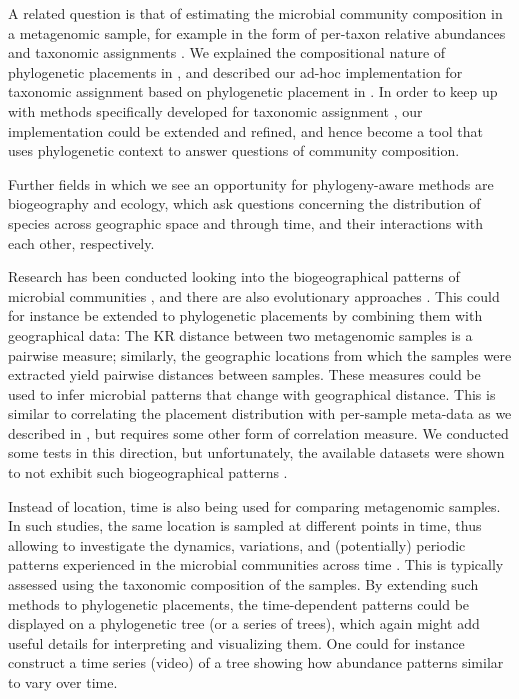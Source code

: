 A related question is that of estimating the microbial community composition in a metagenomic sample,
for example in the form of per-taxon relative abundances and taxonomic assignments \cite{Lindgreen2016}.
We explained the compositional nature of phylogenetic placements in
,
and described our ad-hoc implementation for taxonomic assignment based on phylogenetic placement in %
.
In order to keep up with methods specifically developed for taxonomic assignment
\cite{Lindgreen2016,Sczyrba2017,Almeida2018},
our implementation could be extended and refined,
and hence become a tool that uses phylogenetic context to answer questions of community composition.


Further fields in which we see an opportunity for phylogeny-aware methods are biogeography and ecology,
which ask questions concerning the distribution of species across geographic space and through time,
and their interactions with each other, respectively.

Research has been conducted looking into the biogeographical patterns of microbial communities
\cite{HughesMartiny2006}, and there are also evolutionary approaches \cite{Cox2016}.
This could for instance be extended to phylogenetic placements by combining them with geographical data:
The KR distance between two metagenomic samples is a pairwise measure;
similarly, the geographic locations from which the samples were extracted yield pairwise distances between samples.
These measures could be used to infer microbial patterns that change with geographical distance.
This is similar to correlating the placement distribution with per-sample meta-data
as we described in ,
but requires some other form of correlation measure.
We conducted some tests in this direction, but unfortunately,
the available datasets were shown to not exhibit such biogeographical patterns \cite{Lentendu2018}.

Instead of location, time is also being used for comparing metagenomic samples.
In such studies, the same location is sampled at different points in time,
thus allowing to investigate the dynamics, variations, and (potentially) periodic patterns
experienced in the microbial communities across time \cite{Costello2009,Faust2015}.
This is typically assessed using the taxonomic composition of the samples.
By extending such methods to phylogenetic placements,
the time-dependent patterns could be displayed on a phylogenetic tree (or a series of trees),
which again might add useful details for interpreting and visualizing them.
One could for instance construct a time series (video) of a tree showing
how abundance patterns similar to  vary over time.

